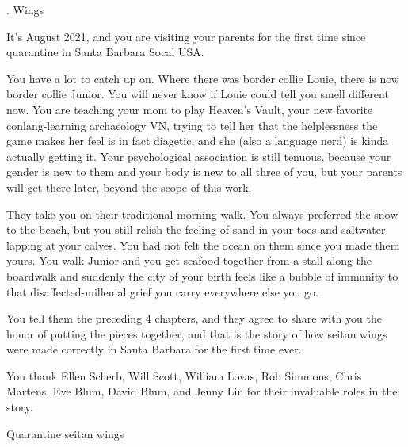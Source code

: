 \documentclass[12pt]{article}
\newcommand\chapter[2]{{\thispagestyle{empty} \Large \sc #1. \quad #2

\vspace{1.5em}}}
\begin{document}
\newpage \thispagestyle{empty}

\chapter{5}{Wings}

It's August 2021, and you are visiting your parents for the first time since quarantine in Santa Barbara Socal USA.

You have a lot to catch up on.
Where there was border collie Louie, there is now border collie Junior.
You will never know if Louie could tell you smell different now.
You are teaching your mom to play Heaven's Vault,
your new favorite conlang-learning archaeology VN,
trying to tell her that the helplessness the game makes her feel is in fact diagetic,
and she (also a language nerd) is kinda actually getting it.
%
Your psychological association is still tenuous,
because your gender is new to them and your body is new to all three of you,
but your parents will get there later, beyond the scope of this work.

They take you on their traditional morning walk. %
You always preferred the snow to the beach,
but you still relish the feeling of sand in your toes and saltwater lapping at your calves.
You had not felt the ocean on them since you made them yours.
You walk Junior and you get seafood together from a stall along the boardwalk
and suddenly the city of your birth feels like a bubble of immunity to that disaffected-millenial grief you carry everywhere else you go.

You tell them the preceding 4 chapters,
and they agree to share with you the honor of putting the pieces together,
and that is the story of how seitan wings were made correctly in Santa Barbara for the first time ever.

\vspace{15em}

\noindent You thank Ellen Scherb, Will Scott, William Lovas, Rob Simmons, Chris Martens, Eve Blum, David Blum, and Jenny Lin for their invaluable roles in the story.

\newpage \thispagestyle{empty}

\begin{center}
	{\sc \large Quarantine seitan wings}
\end{center}
\end{document}
